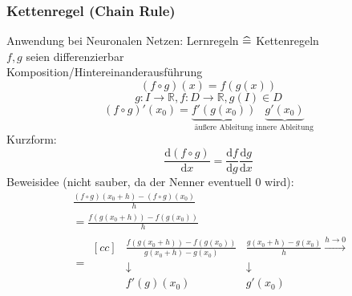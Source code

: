 \subsubsection*{Kettenregel (Chain Rule)}
Anwendung bei Neuronalen Netzen: Lernregeln $\mathrel{\widehat{=}}$ Kettenregeln \\
$f, g$ seien differenzierbar \\
Komposition/Hintereinanderausführung
\begin{equation*}
	(f \circ g)(x) = f(g(x))
\end{equation*}
\begin{equation*}
	g: I \rightarrow \mathbb{R}, f: D \rightarrow \mathbb{R}, g(I) \in D
\end{equation*}
\begin{equation*}
	(f \circ g)' (x_0) = \underbrace{f'(g(x_0))}_{\text{äußere Ableitung}} \underbrace{g'(x_0)}_{\text{innere Ableitung}}
\end{equation*}
Kurzform:
\begin{equation*}
	\frac{\mathrm d (f \circ g)}{\mathrm dx} = \frac{\mathrm df}{\mathrm dg} \frac{\mathrm dg}{\mathrm dx}
\end{equation*}
Beweisidee (nicht sauber, da der Nenner eventuell 0 wird):
\begin{align*}
	& \frac{(f \circ g)(x_0 + h) - (f \circ g)(x_0)}{h} \\
	&= \frac{f(g(x_0 + h)) - f(g(x_0))}{h} \\
	&= \begin{matrix}[cc]
	&\frac{f(g(x_0 + h)) - f(g(x_0))}{g(x_0 + h) - g(x_0)} &\frac{g(x_0 + h) - g(x_0)}{h} \xrightarrow{h \rightarrow 0} \\
	& \downarrow & \downarrow \\
	&f'(g)(x_0) & g'(x_0)
	\end{matrix}
\end{align*}


